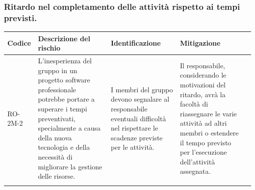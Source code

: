 \documentclass{article}
\begin{document}
\subsubsection{Ritardo nel completamento delle attività rispetto ai tempi previsti.}
\begin{table}[h]
    \centering
    \begin{tabularx}{\textwidth}{l>{\RaggedRight}X>{\RaggedRight}X>{\RaggedRight}X>{\RaggedRight}X}
    \toprule
    \rowcolor{gray!50}
    \textbf{Codice} & \textbf{Descrizione del rischio} & \textbf{Identificazione} & \textbf{Mitigazione} \\
    \midrule
    \addlinespace 
    RO-2M-2 & 
    L'inesperienza del gruppo in un progetto software professionale potrebbe portare a superare i tempi preventivati, specialmente a causa della nuova tecnologia e della necessità di migliorare la gestione delle risorse.& 
    I membri del gruppo devono segnalare al responsabile eventuali difficoltà nel rispettare le scadenze previste per le attività. &
    Il responsabile, considerando le motivazioni del ritardo, avrà la facoltà di riassegnare le varie attività ad altri membri o estendere il tempo previsto per l'esecuzione dell'attività assegnata. \\
    \bottomrule
    \addlinespace 
    \end{tabularx}
\end{table}

\end{document}

